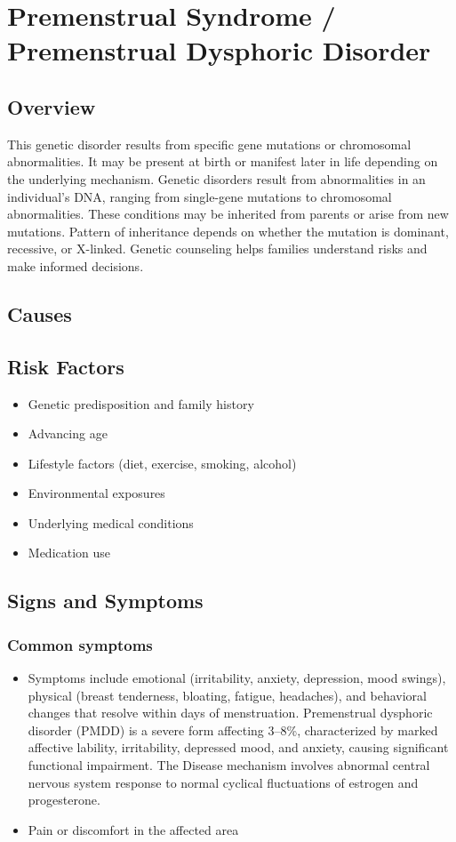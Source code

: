 \chapter{Premenstrual Syndrome / Premenstrual Dysphoric Disorder}
\label{sec:PMS PMDD}

\section{Overview}
This genetic disorder results from specific gene mutations or chromosomal abnormalities. It may be present at birth or manifest later in life depending on the underlying mechanism. Genetic disorders result from abnormalities in an individual's DNA, ranging from single-gene mutations to chromosomal abnormalities. These conditions may be inherited from parents or arise from new mutations. Pattern of inheritance depends on whether the mutation is dominant, recessive, or X-linked. Genetic counseling helps families understand risks and make informed decisions.
\section{Causes}
\section{Risk Factors}

\begin{itemize}[noitemsep]
  \item Genetic predisposition and family history
  \item Advancing age
  \item Lifestyle factors (diet, exercise, smoking, alcohol)
  \item Environmental exposures
  \item Underlying medical conditions
  \item Medication use
\end{itemize}
\section{Signs and Symptoms}

\subsection{Common symptoms}
\begin{itemize}[noitemsep]
  \item Symptoms include emotional (irritability, anxiety, depression, mood swings), physical (breast tenderness, bloating, fatigue, headaches), and behavioral changes that resolve within days of menstruation. Premenstrual dysphoric disorder (PMDD) is a severe form affecting 3--8\%, characterized by marked affective lability, irritability, depressed mood, and anxiety, causing significant functional impairment. The Disease mechanism involves abnormal central nervous system response to normal cyclical fluctuations of estrogen and progesterone.

  \item Pain or discomfort in the affected area
  \end{itemize}

